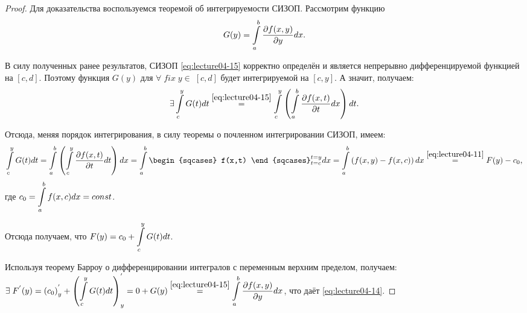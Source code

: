 \begin{proof}
	Для доказательства воспользуемся теоремой об интегрируемости СИЗОП. Рассмотрим функцию
	\begin{equation}
	\label{eq:lecture04-15}
	G(y) = \displaystyle\int\limits_a^b \dfrac{\partial f(x,y)}{\partial y} dx.
	\end{equation}

	В силу полученных ранее результатов, СИЗОП \eqref{eq:lecture04-15} корректно определён и является непрерывно дифференцируемой функцией на $[c,d]$. Поэтому функция $G(y)$ для $\forall \; fix \; y \in \; [c,d]$ будет интегрируемой на $[c,y]$. А значит, получаем:
	\begin{equation*}
	\exists \displaystyle\int\limits_c^y G(t)dt \overset{\eqref{eq:lecture04-15}}{=} \displaystyle\int\limits_c^y \left(\displaystyle\int\limits_a^b  \dfrac{\partial f(x,t)}{\partial t} dx \right) dt.
	\end{equation*}

	Отсюда, меняя порядок интегрирования, в силу теоремы о почленном интегрировании СИЗОП, имеем:
	\begin{equation*}
	\dintl_c^y G(t)dt = \dintl_a^b \left(\dintl_c^y \dfrac{\partial f(x,t)}{\partial t} dt\right) dx = \dintl_a^b \begin{sqcases} f(x,t) \end{sqcases}_{t = c}^{t = y}dx = \dintl_a^b \left(f(x,y) - f(x,c)\right) dx \overset{\eqref{eq:lecture04-11}}{=} F(y) - c_0,
	\end{equation*}
	где $c_0 = \displaystyle\int\limits_a^b f(x,c)dx = const$.

	Отсюда получаем, что $F(y) = c_0 + \displaystyle\int\limits_c^y G(t)dt$.

	Используя теорему Барроу о дифференцировании интегралов с переменным верхним пределом, получаем: \newline	 $\exists \; F^{'}(y) = \left(c_0\right)^{'}_{y} + \left(\displaystyle\int\limits_c^y G(t) dt\right)^{'}_{y} = 0 + G(y) \overset{\eqref{eq:lecture04-15}}{=} \displaystyle\int\limits_a^b \dfrac{\partial f(x,y)}{\partial y} dx$, что даёт \eqref{eq:lecture04-14}.
\end{proof}
